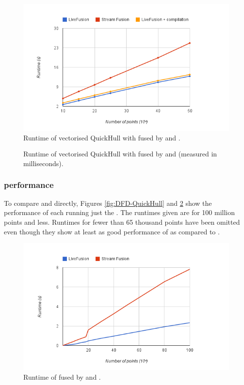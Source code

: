\documentclass[preamble.tex]{subfiles}
\begin{document}
\begin{figure}
\includegraphics[center]{img/Eval-QuickHull}
\caption{Runtime of vectorised QuickHull with \FilterMax fused by \StreamFusion and \LiveFusion.}
\label{fig:Eval-QuickHull}
\end{figure}


\begin{figure}
\caption{Runtime of vectorised QuickHull with \FilterMax fused by \StreamFusion and \LiveFusion (measured in milliseconds).}
\label{fig:Eval-QuickHull-numbers}
\end{figure}


\subsubsection{\FilterMax performance}

To compare \LiveFusion and \StreamFusion directly, Figures \ref{fig:DFD-QuickHull} and \ref{fig:Eval-QuickHull-numbers} show the performance of each running just the \FilterMax. The runtimes given are for 100 million points and less. Runtimes for fewer than 65 thousand points have been omitted even though they show at least as good performance of \LiveFusion as compared to \StreamFusion.


\begin{figure}
\includegraphics[center]{img/Eval-FarAndAboves}
\caption{Runtime of \FilterMax fused by \StreamFusion and \LiveFusion.}
\label{fig:Eval-FarAndAboves}
\end{figure}
\end{document}
